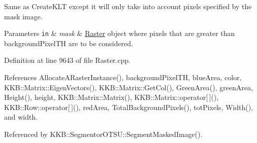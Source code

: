Same as \textquotesingle{}Create\+K\+LT\textquotesingle{} except it will only take into account pixels specified by the \textquotesingle{}mask\textquotesingle{} image. 


\begin{DoxyParams}[1]{Parameters}
\mbox{\tt in}  & {\em mask} & \hyperlink{class_k_k_b_1_1_raster}{Raster} object where pixels that are greater than \textquotesingle{}background\+Pixel\+TH\textquotesingle{} are to be considered. \\
\hline
\end{DoxyParams}


Definition at line 9643 of file Raster.\+cpp.



References Allocate\+A\+Raster\+Instance(), background\+Pixel\+TH, blue\+Area, color, K\+K\+B\+::\+Matrix\+::\+Eigen\+Vectors(), K\+K\+B\+::\+Matrix\+::\+Get\+Col(), Green\+Area(), green\+Area, Height(), height, K\+K\+B\+::\+Matrix\+::\+Matrix(), K\+K\+B\+::\+Matrix\+::operator\mbox{[}$\,$\mbox{]}(), K\+K\+B\+::\+Row\+::operator\mbox{[}$\,$\mbox{]}(), red\+Area, Total\+Background\+Pixels(), tot\+Pixels, Width(), and width.



Referenced by K\+K\+B\+::\+Segmentor\+O\+T\+S\+U\+::\+Segment\+Masked\+Image().



